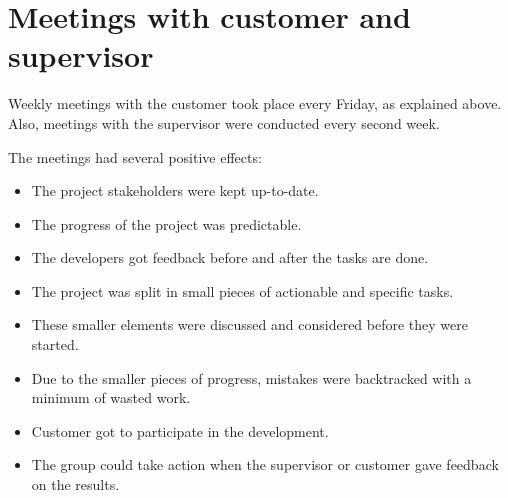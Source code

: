 \section{Meetings with customer and supervisor}
Weekly meetings with the customer took place every Friday, as explained above. Also, meetings with the supervisor were conducted every second week.

The meetings had several positive effects:
\begin{itemize}
\item The project stakeholders were kept up-to-date.
\item The progress of the project was predictable.
\item The developers got feedback before and after the tasks are done.
\item The project was split in small pieces of actionable and specific tasks.
\item These smaller elements were discussed and considered before they were started.
\item Due to the smaller pieces of progress, mistakes were backtracked with a minimum of wasted work.
\item Customer got to participate in the development.
\item The group could take action when the supervisor or customer gave feedback on the results.
\end{itemize}

